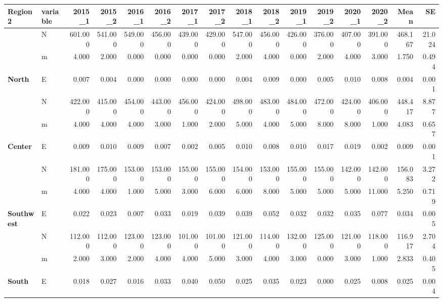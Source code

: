\documentclass[
]{article}
\begin{document}
\begin{table}[H]
\centering
\begin{tabular}{>{}l|l|r|r|r|r|r|r|r|r|r|r|r|r|r|r}
\hline
Region2 & variable & 2015\_1 & 2015\_2 & 2016\_1 & 2016\_2 & 2017\_1 & 2017\_2 & 2018\_1 & 2018\_2 & 2019\_1 & 2019\_2 & 2020\_1 & 2020\_2 & Mean & SE\\
\hline
 & N & 601.000 & 541.000 & 549.000 & 456.000 & 439.000 & 429.000 & 547.000 & 456.000 & 426.000 & 376.000 & 407.000 & 391.000 & 468.167 & 21.024\\
\cline{2-16}
 & m & 4.000 & 2.000 & 0.000 & 0.000 & 0.000 & 0.000 & 2.000 & 4.000 & 0.000 & 2.000 & 4.000 & 3.000 & 1.750 & 0.494\\
\cline{2-16}
\multirow[t]{-3}{*}{\raggedright\arraybackslash \textbf{North}} & E & 0.007 & 0.004 & 0.000 & 0.000 & 0.000 & 0.000 & 0.004 & 0.009 & 0.000 & 0.005 & 0.010 & 0.008 & 0.004 & 0.001\\
\cline{1-16}
 & N & 422.000 & 415.000 & 454.000 & 443.000 & 456.000 & 424.000 & 498.000 & 483.000 & 484.000 & 472.000 & 424.000 & 406.000 & 448.417 & 8.877\\
\cline{2-16}
 & m & 4.000 & 4.000 & 4.000 & 3.000 & 1.000 & 2.000 & 5.000 & 4.000 & 5.000 & 8.000 & 8.000 & 1.000 & 4.083 & 0.657\\
\cline{2-16}
\multirow[t]{-3}{*}{\raggedright\arraybackslash \textbf{Center}} & E & 0.009 & 0.010 & 0.009 & 0.007 & 0.002 & 0.005 & 0.010 & 0.008 & 0.010 & 0.017 & 0.019 & 0.002 & 0.009 & 0.001\\
\cline{1-16}
 & N & 181.000 & 175.000 & 153.000 & 153.000 & 155.000 & 155.000 & 154.000 & 153.000 & 155.000 & 155.000 & 142.000 & 142.000 & 156.083 & 3.272\\
\cline{2-16}
 & m & 4.000 & 4.000 & 1.000 & 5.000 & 3.000 & 6.000 & 6.000 & 8.000 & 5.000 & 5.000 & 5.000 & 11.000 & 5.250 & 0.719\\
\cline{2-16}
\multirow[t]{-3}{*}{\raggedright\arraybackslash \textbf{Southwest}} & E & 0.022 & 0.023 & 0.007 & 0.033 & 0.019 & 0.039 & 0.039 & 0.052 & 0.032 & 0.032 & 0.035 & 0.077 & 0.034 & 0.005\\
\cline{1-16}
 & N & 112.000 & 112.000 & 123.000 & 123.000 & 101.000 & 101.000 & 121.000 & 114.000 & 132.000 & 125.000 & 121.000 & 118.000 & 116.917 & 2.704\\
\cline{2-16}
 & m & 2.000 & 3.000 & 2.000 & 4.000 & 4.000 & 5.000 & 3.000 & 4.000 & 3.000 & 0.000 & 3.000 & 1.000 & 2.833 & 0.405\\
\cline{2-16}
\multirow[t]{-3}{*}{\raggedright\arraybackslash \textbf{South}} & E & 0.018 & 0.027 & 0.016 & 0.033 & 0.040 & 0.050 & 0.025 & 0.035 & 0.023 & 0.000 & 0.025 & 0.008 & 0.025 & 0.004\\

\end{tabular}
\end{table}
\end{document}
